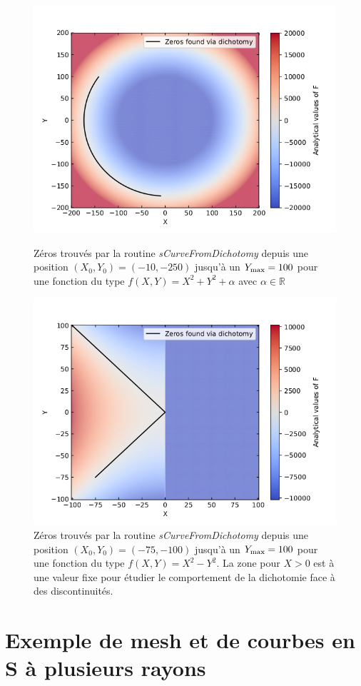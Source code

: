 \documentclass[a4paper,12pt]{article}
\begin{document}
    \begin{figure}[hb]
        \centering
        \vspace{-20pt}
        \includegraphics[width=0.6\linewidth]{Circle_dicho.png}
        \caption{Zéros trouvés par la routine \textit{sCurveFromDichotomy} depuis une position $(X_0 , Y_0) = (-10 , -250)$ jusqu'à un $Y_{\rm{max}} = 100$ pour une fonction du type $f(X,Y) = X^2 + Y^2 + \alpha$ avec $\alpha \in \mathbb{R}$}
        \label{CircleDicho}
        
        \includegraphics[width=0.6\linewidth]{DiffSquares_dicho.png}
        \caption{Zéros trouvés par la routine \textit{sCurveFromDichotomy} depuis une position $(X_0 , Y_0) = (-75 , -100)$ jusqu'à un $Y_{\rm{max}} = 100$ pour une fonction du type $f(X,Y) = X^2 - Y^2$. La zone pour $X>0$ est à une valeur fixe pour étudier le comportement de la dichotomie face à des discontinuités. }
        \label{Fig:Diffsquares}
    \end{figure}
    
\newpage
\section{Exemple de mesh et de courbes en S à plusieurs rayons}
\label{Annexe:Exemple}
\end{document}
